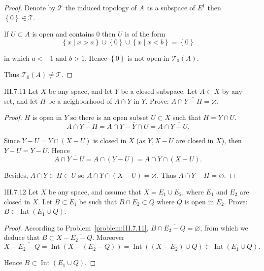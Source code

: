 \begin{proof}
    Denote by \( \mathscr{T} \) the induced topology of \( A \) as a subspace of \( E^{1} \) then \( \left\{0\right\} \in \mathscr{T} \).

    If \( U \subset A \) is open and contains \( 0 \) then \( U \) is of the form
    \[
        \left\{ x \mid x > a \right\} \cup \left\{0\right\} \cup \left\{ x \mid x < b \right\} = \left\{0\right\}
    \]

    in which \( a < -1 \) and \( b > 1 \). Hence \( \left\{0\right\} \) is not open in \( \mathscr{T}_{0}(A) \).

    Thus \( \mathscr{T}_{0}(A) \ne \mathscr{T} \).
\end{proof}

\begin{problem}{III.7.11}\label{problem:III.7.11}
Let \(X\) be any space, and let \(Y\) be a closed subspace. Let \(A\subset X\) by any set, and let \(H\) be a neighborhood of \( A \cap Y \) in \(Y\). Prove: \( A \cap \overline{Y - H} = \varnothing \).
\end{problem}

\begin{proof}
    \( H \) is open in \( Y \) so there is an open subset \( U \subset X \) such that \( H = Y \cap U \).
    \[
        A \cap \overline{Y - H} = A \cap \overline{Y - Y \cap U} = A \cap \overline{Y - U}.
    \]

    Since \( Y - U = Y \cap (X - U) \) is closed in \(X\) (as \(Y, X - U\) are closed in \(X\)), then \( \overline{Y - U} = Y - U \). Hence
    \[
        A \cap \overline{Y - U} = A \cap (Y - U) = A \cap Y \cap (X - U).
    \]

    Besides, \( A \cap Y \subset H \subset U \) so \( A \cap Y \cap (X - U) = \varnothing \). Thus \( A \cap \overline{Y - H} = \varnothing \).
\end{proof}

\begin{problem}{III.7.12}
Let \(X\) be any space, and assume that \(X = E_{1} \cup E_{2}\), where \(E_{1}\) and \(E_{2}\) are closed in \(X\). Let \( B \subset E_{1} \) be such that \( B \cap E_{2} \subset Q \) where \( Q \) is open in \(E_{2}\). Prove: \(B \subset \operatorname{Int}(E_{1} \cup Q)\).
\end{problem}

\begin{proof}
    According to Problem~\ref{problem:III.7.11}, \( B \cap \overline{E_{2} - Q} = \varnothing \), from which we deduce that \( B \subset X - \overline{E_{2} - Q} \). Moreover
    \[
        X - \overline{E_{2} - Q} = \operatorname{Int}(X - (E_{2} - Q)) = \operatorname{Int}((X - E_{2}) \cup Q) \subset \operatorname{Int}(E_{1} \cup Q).
    \]

    Hence \( B \subset \operatorname{Int}(E_{1} \cup Q) \).
\end{proof}

